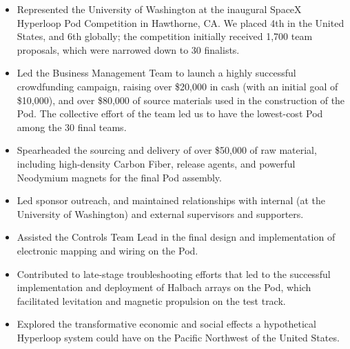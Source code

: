 \documentclass[10pt]{article}
\newcommand{\tabularxwidth}{\textwidth}
\begin{document}
\begin{minipage}{\tabularxwidth}
\begin{itemize}[noitemsep, topsep=3pt, parsep=0pt, partopsep=0pt]
                \item 
    Represented the University of Washington at the inaugural SpaceX Hyperloop Pod Competition in Hawthorne, CA. We placed 4th in the United States, and 6th globally; the competition initially received 1,700 team proposals, which were narrowed down to 30 finalists.
            
                \item 
    Led the Business Management Team to launch a highly successful crowdfunding campaign, raising over \$20,000 in cash (with an initial goal of \$10,000), and over \$80,000 of source materials used in the construction of the Pod. The collective effort of the team led us to have the lowest-cost Pod among the 30 final teams.
            
                \item 
    Spearheaded the sourcing and delivery of over \$50,000 of raw material, including high-density Carbon Fiber, release agents, and powerful Neodymium magnets for the final Pod assembly.
            
                \item 
    Led sponsor outreach, and maintained relationships with internal (at the University of Washington) and external supervisors and supporters.
            
                \item 
    Assisted the Controls Team Lead in the final design and implementation of electronic mapping and wiring on the Pod.
            
                \item 
    Contributed to late-stage troubleshooting efforts that led to the successful implementation and deployment of Halbach arrays on the Pod, which facilitated levitation and magnetic propulsion on the test track.
            
                \item 
    Explored the transformative economic and social effects a hypothetical Hyperloop system could have on the Pacific Northwest of the United States.
            
        \end{itemize}

        
            \vspace{.5em}
        

    \end{minipage}
    
\end{document}
